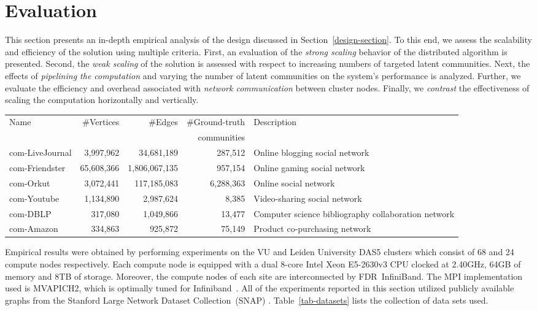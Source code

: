 \section{Evaluation}

This section presents an in-depth empirical analysis of the design discussed in
Section~\ref{design-section}. To this end, we assess the scalability and
efficiency of the solution using multiple criteria.
%
First, an evaluation of the \textit{strong scaling} behavior of the distributed
algorithm is presented.
%
Second, the \textit{weak scaling} of the solution is assessed with respect to increasing
numbers of targeted latent communities.
%
Next, the effects of \textit{pipelining the computation} and varying the number of latent communities on the system's
performance is analyzed.
%
Further, we evaluate the efficiency and overhead associated with \textit{network
communication} between cluster nodes.
%
Finally, we \textit{contrast} the effectiveness of scaling the computation horizontally
and vertically.

\begin{table*}
  \centering
  \begin{tabular}{l r r r l}
    Name            & \#Vertices &       \#Edges & \#Ground-truth & Description \\
                    &            &               & communities    &             \\
    \hline
    com-LiveJournal &  3,997,962 &    34,681,189 & 287,512        & Online blogging social network \\
    com-Friendster  & 65,608,366 & 1,806,067,135 & 957,154        & Online gaming social network \\
    com-Orkut       &  3,072,441 &   117,185,083 & 6,288,363      & Online social network \\
    com-Youtube     &  1,134,890 &     2,987,624 & 8,385          & Video-sharing social network \\
    com-DBLP        &    317,080 &     1,049,866 & 13,477         & Computer science bibliography collaboration network \\
    com-Amazon      &    334,863 &       925,872 & 75,149         & Product co-purchasing network \\
    \hline
  \end{tabular}
  \caption{Summary of SNAP graph data sets used for evaluation.}
  \label{tab-datasets}
\end{table*}

Empirical results were obtained by performing experiments on the VU and
Leiden University
DAS5 clusters which consist of 68 and 24 compute nodes respectively. Each
compute node is equipped with a dual 8-core Intel Xeon E5-2630v3 CPU clocked
at 2.40GHz, 64GB of memory and 8TB of storage. Moreover, the compute nodes of
each site are interconnected by
FDR~InfiniBand. The MPI implementation used is MVAPICH2, which is optimally
tuned for Infiniband~\cite{mvapich}. All of the experiments reported in this section utilized
publicly available graphs from the Stanford Large Network Dataset
Collection~(SNAP) \cite{snapnets}. Table~\ref{tab-datasets} lists the
collection of data sets used.

